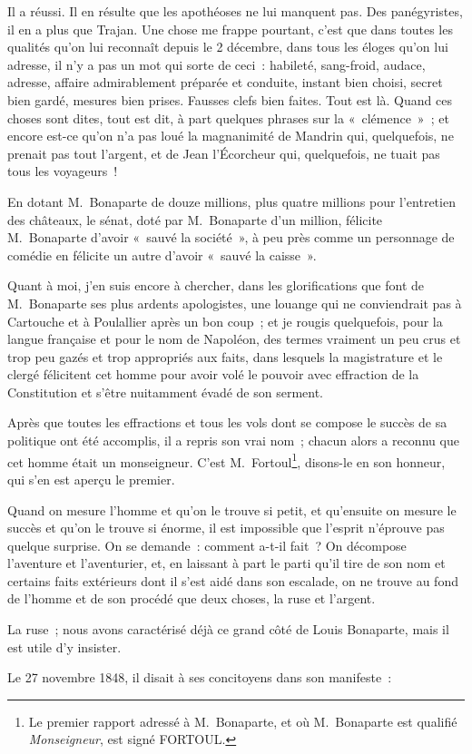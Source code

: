 \documentclass[french,twoside]{book} %
\begin{document}
\noindent Il a réussi. Il en résulte que les apothéoses ne lui manquent pas. Des panégyristes, il en a plus que Trajan. Une chose me frappe pourtant, c’est que dans toutes les qualités qu’on lui reconnaît depuis le 2 décembre, dans tous les éloges qu’on lui adresse, il n’y a pas un mot qui sorte de ceci : habileté, sang-froid, audace, adresse, affaire admirablement préparée et conduite, instant bien choisi, secret bien gardé, mesures bien prises. Fausses clefs bien faites. Tout est là. Quand ces choses sont dites, tout est dit, à part quelques phrases sur la « clémence » ; et encore est-ce qu’on n’a pas loué la magnanimité de Mandrin qui, quelquefois, ne prenait pas tout l’argent, et de Jean l’Écorcheur qui, quelquefois, ne tuait pas tous les voyageurs !\par
En dotant M. Bonaparte de douze millions, plus quatre millions pour l’entretien des châteaux, le sénat, doté par M. Bonaparte d’un million, félicite M. Bonaparte d’avoir « sauvé la société », à peu près comme un personnage de comédie en félicite un autre d’avoir « sauvé la caisse ».\par
Quant à moi, j’en suis encore à chercher, dans les glorifications que font de M. Bonaparte ses plus ardents apologistes, une louange qui ne conviendrait pas à Cartouche et à Poulallier après un bon coup ; et je rougis quelquefois, pour la langue française et pour le nom de Napoléon, des termes vraiment un peu crus et trop peu gazés et trop appropriés aux faits, dans lesquels la magistrature et le clergé félicitent cet homme pour avoir volé le pouvoir avec effraction de la Constitution et s’être nuitamment évadé de son serment.\par
Après que toutes les effractions et tous les vols dont se compose le succès de sa politique ont été accomplis, il a repris son vrai nom ; chacun alors a reconnu que cet homme était un monseigneur. C’est M. Fortoul\footnote{Le premier rapport adressé à M. Bonaparte, et où M. Bonaparte est qualifié \emph{Monseigneur}, est signé FORTOUL.}, disons-le en son honneur, qui s’en est aperçu le premier.\par
Quand on mesure l’homme et qu’on le trouve si petit, et qu’ensuite on mesure le succès et qu’on le trouve si énorme, il est impossible que l’esprit n’éprouve pas quelque surprise. On se demande : comment a-t-il fait ? On décompose l’aventure et l’aventurier, et, en laissant à part le parti qu’il tire de son nom et certains faits extérieurs dont il s’est aidé dans son escalade, on ne trouve au fond de l’homme et de son procédé que deux choses, la ruse et l’argent.\par
La ruse ; nous avons caractérisé déjà ce grand côté de Louis Bonaparte, mais il est utile d’y insister.\par
Le 27 novembre 1848, il disait à ses concitoyens dans son manifeste :\par
\end{document}
